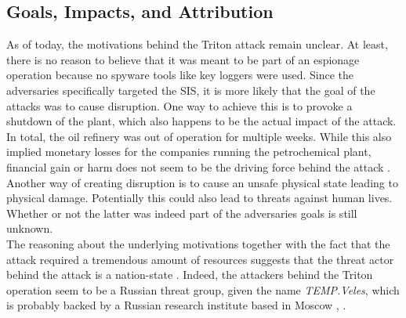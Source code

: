 \documentclass[runningheads]{llncs}
\begin{document}
\subsection{Goals, Impacts, and Attribution}
As of today, the motivations behind the Triton attack remain unclear.
At least, there is no reason to believe that it was meant to be part of an espionage operation because no spyware tools like key loggers were used. %
Since the adversaries specifically targeted the SIS, it is more likely that the goal of the attacks was to cause disruption.
One way to achieve this is to provoke a shutdown of the plant, which also happens to be the actual impact of the attack.
In total, the oil refinery was out of operation for multiple weeks. %
While this also implied monetary losses for the companies running the petrochemical plant, financial gain or harm does not seem to be the driving force behind the attack \cite{kovacs.17}.
Another way of creating disruption is to cause an unsafe physical state leading to physical damage. \cite{dragos.17}
Potentially this could also lead to threats against human lives.
Whether or not the latter was indeed part of the adversaries goals is still unknown.\\
The reasoning about the underlying motivations together with the fact that the attack required a tremendous amount of resources suggests that the threat actor behind the attack is a nation-state \cite{kovacs.17}.
Indeed, the attackers behind the Triton operation seem to be a Russian threat group, given the name \textit{TEMP.Veles}, which is probably backed by a Russian research institute based in Moscow \cite{fireeye.18}, \cite{sobczak.19}.
\end{document}
